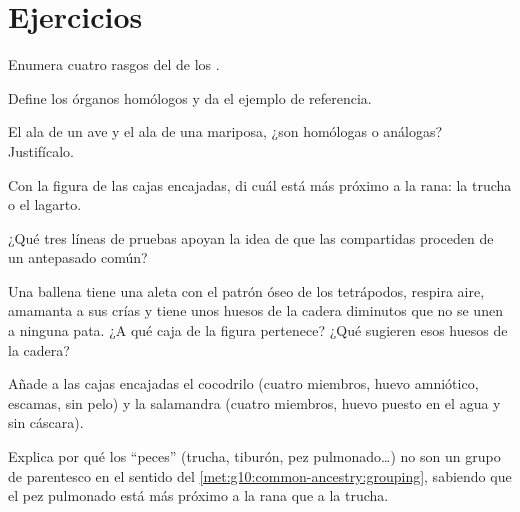 \section{Ejercicios}

\begin{exercise}[$\star$]\label{exo:g10:common-ancestry:1}
Enumera cuatro rasgos del  de los .
\end{exercise}

\begin{exercise}[$\star$]\label{exo:g10:common-ancestry:2}
Define los órganos homólogos y da el ejemplo de referencia.
\end{exercise}

\begin{exercise}[$\star$]\label{exo:g10:common-ancestry:3}
El ala de un ave y el ala de una mariposa, ¿son homólogas o análogas?
Justifícalo.
\end{exercise}

\begin{exercise}[$\star$]\label{exo:g10:common-ancestry:4}
Con la figura de las cajas encajadas, di cuál está más próximo a la
rana: la trucha o el lagarto.
\end{exercise}

\begin{exercise}[$\star$]\label{exo:g10:common-ancestry:5}
¿Qué tres líneas de pruebas apoyan la idea de que las 
compartidas proceden de un antepasado común?
\end{exercise}

\begin{exercise}[$\star\star$]\label{exo:g10:common-ancestry:6}
Una ballena tiene una aleta con el patrón óseo de los tetrápodos,
respira aire, amamanta a sus crías y tiene unos huesos de la cadera
diminutos que no se unen a ninguna pata. ¿A qué caja de la figura
pertenece? ¿Qué sugieren esos huesos de la cadera?
\end{exercise}

\begin{exercise}[$\star\star$]\label{exo:g10:common-ancestry:7}
Añade a las cajas encajadas el cocodrilo (cuatro miembros, huevo
amniótico, escamas, sin pelo) y la salamandra (cuatro miembros, huevo
puesto en el agua y sin cáscara).
\end{exercise}

\begin{exercise}[$\star\star$]\label{exo:g10:common-ancestry:8}
Explica por qué los ``peces'' (trucha, tiburón, pez pulmonado\dots) no
son un grupo de parentesco en el sentido del
\cref{met:g10:common-ancestry:grouping}, sabiendo que el pez pulmonado
está más próximo a la rana que a la trucha.
\end{exercise}

